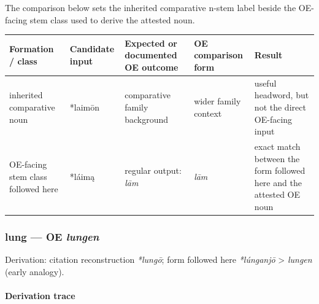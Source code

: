 \documentclass[
  british,
  a4paper,
]{article}
\newcounter{none} %
\begin{document}
The comparison below sets the inherited comparative n-stem label beside
the OE-facing stem class used to derive the attested noun.

{\def\LTcaptype{none} %
\begin{longtable}[]{@{}
  >{\raggedright\arraybackslash}p{}
  >{\raggedright\arraybackslash}p{}
  >{\raggedright\arraybackslash}p{}
  >{\raggedright\arraybackslash}p{}
  >{\raggedright\arraybackslash}p{}@{}}
\toprule\noalign{}
\begin{minipage}[b]{\linewidth}\raggedright
Formation / class
\end{minipage} & \begin{minipage}[b]{\linewidth}\raggedright
Candidate input
\end{minipage} & \begin{minipage}[b]{\linewidth}\raggedright
Expected or documented OE outcome
\end{minipage} & \begin{minipage}[b]{\linewidth}\raggedright
OE comparison form
\end{minipage} & \begin{minipage}[b]{\linewidth}\raggedright
Result
\end{minipage} \\
\midrule\noalign{}
\endhead
\bottomrule\noalign{}
\endlastfoot
inherited comparative noun & *laimōn & comparative family background &
wider family context & useful headword, but not the direct OE-facing
input \\
OE-facing stem class followed here & *láimą & regular output: \emph{lām}
& \emph{lām} & exact match between the form followed here and the
attested OE noun \\
\end{longtable}
}

\subsubsection{\texorpdfstring{lung --- OE
\emph{lungen}}{lung --- OE lungen}}\label{lung-oe-lungen}

Derivation: citation reconstruction \emph{*lungō}; form followed here
\emph{*lúnganjō} \textgreater{} \emph{lungen} (early analogy).

\paragraph{Derivation trace}\label{derivation-trace-101}
\end{document}

